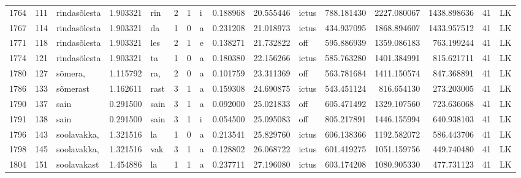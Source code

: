 \begin{tabular}{lrlrllllrrlrrrll}
1764 &         111 &     rindasõlesta &  1.903321 &     rin &        2 &      1 &       i &      0.188968 &     20.555446 &  ictus &   788.181430 &  2227.080067 &  1438.898636 &     41 &        LK \\
1767 &         114 &     rindasõlesta &  1.903321 &      da &        1 &      0 &       a &      0.231208 &     21.018973 &  ictus &   434.937095 &  1868.894607 &  1433.957512 &     41 &        LK \\
1771 &         118 &     rindasõlesta &  1.903321 &     les &        2 &      1 &       e &      0.138271 &     21.732822 &    off &   595.886939 &  1359.086183 &   763.199244 &     41 &        LK \\
1774 &         121 &     rindasõlesta &  1.903321 &      ta &        1 &      0 &       a &      0.180380 &     22.156266 &  ictus &   585.763280 &  1401.384991 &   815.621711 &     41 &        LK \\
1780 &         127 &          sõmera, &  1.115792 &     ra, &        2 &      0 &       a &      0.101759 &     23.311369 &    off &   563.781684 &  1411.150574 &   847.368891 &     41 &        LK \\
1786 &         133 &         sõmerast &  1.162611 &    rast &        3 &      1 &       a &      0.159308 &     24.690875 &  ictus &   543.451124 &   816.654130 &   273.203005 &     41 &        LK \\
1790 &         137 &             sain &  0.291500 &    sain &        3 &      1 &       a &      0.092000 &     25.021833 &    off &   605.471492 &  1329.107560 &   723.636068 &     41 &        LK \\
1791 &         138 &             sain &  0.291500 &    sain &        3 &      1 &       i &      0.054500 &     25.095083 &    off &   805.217891 &  1446.155994 &   640.938103 &     41 &        LK \\
1796 &         143 &      soolavakka, &  1.321516 &      la &        1 &      0 &       a &      0.213541 &     25.829760 &  ictus &   606.138366 &  1192.582072 &   586.443706 &     41 &        LK \\
1798 &         145 &      soolavakka, &  1.321516 &     vak &        3 &      1 &       a &      0.128802 &     26.068722 &  ictus &   601.419275 &  1051.159756 &   449.740480 &     41 &        LK \\
1804 &         151 &      soolavakast &  1.454886 &      la &        1 &      1 &       a &      0.237711 &     27.196080 &  ictus &   603.174208 &  1080.905330 &   477.731123 &     41 &        LK \\

\end{tabular}
